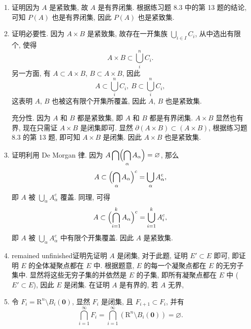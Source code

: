 % 
\begin{enumerate}
    \item %
        {\heiti 证明}\quad 因为 $A$ 是紧致集, 故 $A$ 是有界闭集. 根据练习题 8.3 中的第 13 题的结论,
        可知 $P(A)$ 也是有界闭集, 因此 $P(A)$ 也是紧致集.
    \item %
        {\heiti 证明}\quad 必要性. 因为 $A \times B$ 是紧致集, 故存在一开集族 $\bigcup_{i \in I}C_i$, 从中选出有限个, 使得
        \[
            A \times B \subset \bigcup_{i}^{n}C_i.    
        \]
        另一方面, 有 $A \subset A \times B$, $B \subset A \times B$, 因此
        \[
            A \subset \bigcup_{i}^{n}C_i,\ B \subset \bigcup_{i}^{n}C_i,   
        \]
        这表明 $A$, $B$ 也被这有限个开集所覆盖, 因此 $A$, $B$ 也是紧致集.

        充分性. 因为 $A$ 和 $B$ 都是紧致集, 即 $A$ 和 $B$ 都是有界闭集. $A \times B$ 显然也有界, 现在只需证 $A \times B$ 是闭集即可.
        显然 $\partial(A \times B) \subset (A \times B)$, 根据练习题 8.3 的第 13 题, 即可知 $A \times B$ 是闭集. 因此 $A \times B$ 也是紧致集.
    \item %
        {\heiti 证明}\quad 利用 De Morgan 律. 因为 $\displaystyle{A \bigcap \Bigl(\bigcap_{\alpha}A_\alpha\Bigr) = \varnothing}$, 那么
        \[
            A \subset \Bigl(\bigcap_{\alpha}A_\alpha\Bigr)^c = \bigcup_{\alpha}A_\alpha^c,
        \]
        即 $A$ 被 $\displaystyle{\bigcup_{\alpha}A_\alpha^c}$ 覆盖. 同理, 可得
        \[
            A \subset \Bigl(\bigcap_{i=1}^kA_\alpha\Bigr)^c =  \bigcup_{i=1}^kA_i^c,   
        \]
        即 $A$ 被 $\displaystyle{\bigcup_{\alpha}A_\alpha^c}$ 中有限个开集覆盖. 因此 $A$ 是紧致集.
    \item %
        {\heiti\color{red} remained unfinished}{\heiti 证明}\quad 先证明 $A$ 是闭集, 对于此题, 证明 $E' \subset E$ 即可, 即证明 $E$ 的全体凝聚点都在 $E$ 中.
        根据题意, $E$ 的每一个凝聚点都在 $E$ 的无穷子集中. 显然将这些无穷子集的并依然是 $E$ 的子集, 即所有凝聚点都在 $E$ 中 ($E' \subset E$), 因此 $E$ 是闭集.
        在证明 $A$ 是有界的, 若 $A$ 无界, 
    \item %
        令 $F_i = \mathrm{R}^n \setminus B_i(\boldsymbol{0})$, 显然 $F_i$ 是闭集, 且 $F_{i+1} \subset F_i$, 并有
        \[
            \bigcap_{i=1}^{\infty}F_i = \bigcap_{i=1}^{\infty}\left(\mathrm{R}^n \setminus B_i(\boldsymbol{0})\right) = \varnothing.    
        \]
        

\end{enumerate}
